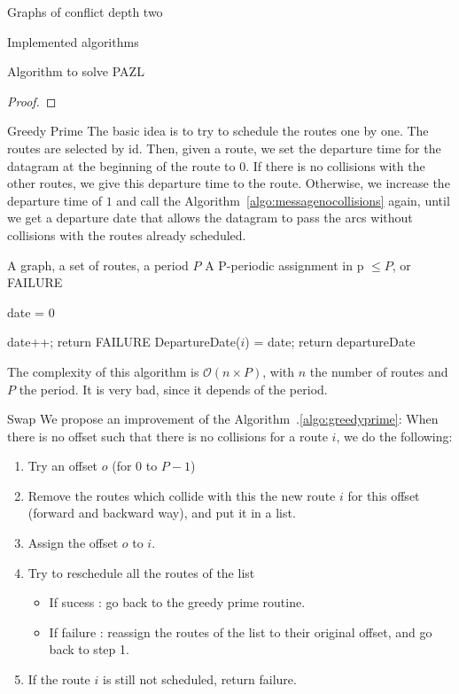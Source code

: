 \documentclass[10pt]{article}
\begin{document}
\begin{section}{Graphs of conflict depth two}
\begin{subsection}{Implemented algorithms}
\begin{subsubsection}{Algorithm to solve PAZL }
\begin{proof}
   
     \end{proof}
   
  \begin{paragraph}{Greedy Prime}
  The basic idea is to try to schedule the routes one by one. The routes are selected by id.  Then, given a route, we set the departure time for the datagram at the beginning of the route to $0$. If there is no collisions with the other routes, we give this departure time to the route. Otherwise, we increase the departure time of $1$ and call the Algorithm~\ref{algo:messagenocollisions} again, until we get a departure date that allows the datagram to pass the arcs without collisions with the routes already scheduled.

   	\begin{algorithm}[H]
 	\caption{Greedy Prime}
	\label{algo:greedyprime}
 	\begin{algorithmic}
 	\REQUIRE A graph, a set of routes, a period $P$
	\ENSURE A P-periodic assignment in p $\leq P$, or FAILURE

	\STATE date = $0$
	
 	
 	\STATE date++;
	\STATE return FAILURE
	\ENDIF
 	\ENDWHILE
	\STATE DepartureDate($i$) = date;
 	\ENDFOR
	\STATE return departureDate
 	\end{algorithmic}
 	\end{algorithm}
 	The complexity of this algorithm is $\mathcal{O}(n\times P)$, with $n$ the number of routes and $P$ the period. It is very bad, since it depends of the period.
 	
 	  \end{paragraph}
    \begin{paragraph}{Swap}
    We propose an improvement of the Algorithm~.\ref{algo:greedyprime}: When there is no offset such that there is no collisions for a route $i$, we do the following:
    \begin{enumerate}
     \item Try an offset $o$ (for $0$ to $P-1$)
     \item Remove the routes which collide with this the new route $i$ for this offset (forward and backward way), and put it in a list.
     \item Assign the offset $o$ to $i$.
     \item Try to reschedule all the routes of the list
     \begin{itemize}
      \item If sucess : go back to the greedy prime routine.
      \item If failure : reassign the routes of the list to their original offset, and go back to step 1. 
     \end{itemize}
    \item If the route $i$ is still not scheduled, return failure.
    \end{enumerate}


\end{paragraph}
\end{subsubsection}
\end{subsection}
\end{section}
\end{document}
